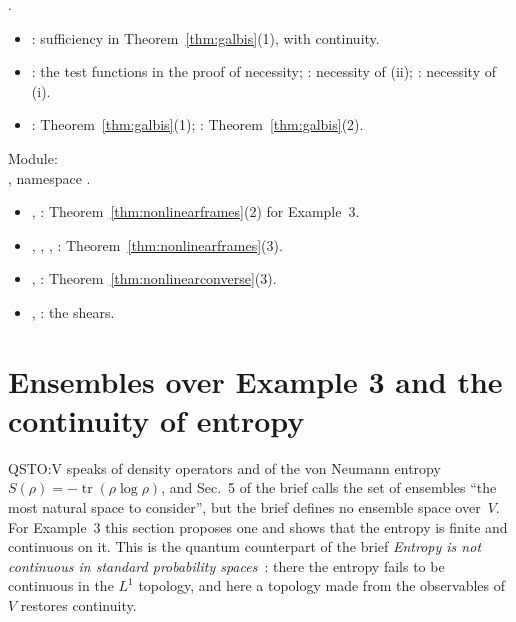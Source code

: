 \documentclass[11pt]{article}
\theoremstyle{definition}
\begin{document}
.
\begin{itemize}
  \item {}: sufficiency in Theorem~\ref{thm:galbis}(1), with continuity.
  \item {}: the test functions in the proof of necessity;
    : necessity of (ii);
    : necessity of (i).
  \item {}: Theorem~\ref{thm:galbis}(1);
    : Theorem~\ref{thm:galbis}(2).
\end{itemize}
Module:\\ , namespace
.
\begin{itemize}
  \item {}, : Theorem~\ref{thm:nonlinearframes}(2) for
    Example~3.
  \item {}, ,
    , :
    Theorem~\ref{thm:nonlinearframes}(3).
  \item {}, :
    Theorem~\ref{thm:nonlinearconverse}(3).
  \item {}, : the shears.
\end{itemize}

\section{Ensembles over Example 3 and the continuity of entropy}
\label{sec:ensembles}

QSTO:V speaks of density operators and of the von Neumann entropy
$S(\rho) = -\operatorname{tr}(\rho\log\rho)$, and Sec.~5 of the brief calls the set of ensembles
``the most natural space to consider'', but the brief defines no ensemble space over~$V$. For
Example~3 this section proposes one and shows that the entropy is finite and continuous on it.
This is the quantum counterpart of the brief \emph{Entropy is not continuous in standard
probability spaces}~\cite{entropy}: there the entropy fails to be continuous in the $L^1$
topology, and here a topology made from the observables of $V$ restores continuity.
\end{document}

